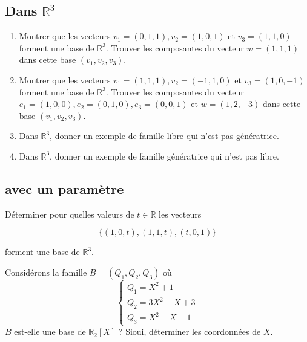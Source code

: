 \vspace{2em}

\subsection{Dans $\mathbb{R}^3$}
\begin{enumerate}
\item  Montrer que les vecteurs $v_1=(0,1,1), v_2=(1,0,1)$ et $v_3=(1,1,0)$ forment une base de $\mathbb{R}^3$. \newline
 Trouver les composantes du vecteur $w=(1,1,1)$ dans cette base $\left(v_1, v_2, v_3\right)$.

\item Montrer que les vecteurs $v_1=(1,1,1), v_2=(-1,1,0)$ et $v_3=(1,0,-1)$ forment une base de $\mathbb{R}^3$. \newline 
Trouver les composantes du vecteur $e_1=(1,0,0), e_2=(0,1,0), e_3=(0,0,1)$ et $w=(1,2,-3)$ dans cette base $\left(v_1, v_2, v_3\right)$.

\item Dans $\mathbb{R}^3$, donner un exemple de famille libre qui n'est pas génératrice.

\item Dans $\mathbb{R}^3$, donner un exemple de famille génératrice qui n'est pas libre.

\end{enumerate}

\vspace{2em}

\subsection{avec un paramètre}

Déterminer pour quelles valeurs de $t \in \mathbb{R}$ les vecteurs

$$
\{(1,0, t),(1,1, t),(t, 0,1)\}
$$

forment une base de $\mathbb{R}^3$.

\vspace{2em}
Considérons la famille $B=\left(Q_1, Q_2, Q_3\right)$ où $$\left\{\begin{array}{l}Q_1=X^2+1 \\ Q_2=3 X^2-X+3 \\ Q_3=X^2-X-1\end{array}\right.$$
$B$ est-elle une base de $\mathbb{R}_2[X]$ ? Sioui, déterminer les coordonnées de $X$.
  
